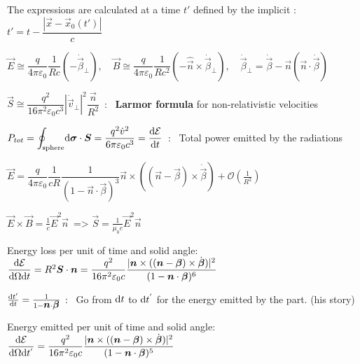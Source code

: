 \begin{squishlist}
The expressions are calculated at a time $t'$ defined by the implicit : $t' = t - \dfrac{|\vec{x} - \vec{x}_0(t')|}{c}$%

\end{squishlist}


\begin{squishlist}
\item $\vec{E} \cong \dfrac{q}{4\pi\varepsilon_0} \dfrac{1}{Rc} (-\dot{\vec{\beta}}_\perp), \quad \vec{B} \cong \dfrac{q}{4\pi\varepsilon_0} \dfrac{1}{Rc^2} (-\hat{\vec{n}}\times \dot{\vec{\beta}}_\perp) , \quad \dot{\vec{\beta}}_{\perp} = \dot{\vec{\beta}} - \vec{n}(\vec{n}\cdot\dot{\vec{\beta}}) $\\

\item $\vec{S} \cong \dfrac{q^2}{16 \pi^2 \varepsilon_0 c^3} |\dot{\vec{v}}_\perp|^2 \dfrac{\vec{n}}{R^2} \,$ : \, \textbf{Larmor formula} for non-relativistic velocities

\item $P_{tot} = \displaystyle{\oint_{\text{sphere}}} \mbox{\boldmath$\textrm{d} \sigma$}\cdot \mbox{\boldmath$S$} = \dfrac{q^2 \dot{v}^2}{6\pi\varepsilon_0 c^3}=\frac{\textrm{d} \mathcal{E}}{\textrm{d} t} \, $ : \, Total power emitted by the radiations
\end{squishlist}
\begin{squishlist}
\item $\vec{E} = \dfrac{q}{4\pi\varepsilon_0}\dfrac{1}{cR}\dfrac{1}{(1-\vec{n}\cdot\vec{\beta})^3} \vec{n} \times ((\vec{n} - \vec{\beta}) \times \dot{\vec{\beta}}) + \mathcal{O}\left(\frac{1}{R^2}\right)$

\item $\vec{E} \times \vec{B} = \frac{1}{c} \vec{E}^2 \vec{n} \, $ => $\vec{S} = \frac{1}{\mu_0 c} \vec{E}^2\vec{n}$

\item Energy loss per unit of time and solid angle: $\dfrac{\textrm{d} \mathcal{E}}{\textrm{d} \Omega \textrm{d} t} = R^2\mbox{\boldmath$S$}\cdot\mbox{\boldmath$n$} = \dfrac{q^2}{16\pi^2 \varepsilon_0 c} \dfrac{|\mbox{\boldmath$n$}\times ((\mbox{\boldmath$n$}-\mbox{\boldmath$\beta$}) \times \dot{\mbox{\boldmath$\beta$}})|^2}{(1-\mbox{\boldmath$n$}\cdot\mbox{\boldmath$\beta$})^6}$

\item $\frac{\textrm{d} t'}{\textrm{d} t} = \frac{1}{1-\mbox{\boldmath$n$}\cdot\mbox{\boldmath$\beta$}}$ : \  Go from $\textrm{d} t$ to $\textrm{d} t^{'}$ for the energy emitted by the part. (his story)  
\\
\item Energy emitted per unit of time and solid angle:
$\dfrac{\textrm{d} \mathcal{E}}{\textrm{d} \Omega \textrm{d} t^{'}} = \dfrac{q^2}{16\pi^2 \varepsilon_0 c} \dfrac{|\mbox{\boldmath$n$}\times ((\mbox{\boldmath$n$}-\mbox{\boldmath$\beta$}) \times \dot{\mbox{\boldmath$\beta$}})|^2}{(1-\mbox{\boldmath$n$}\cdot\mbox{\boldmath$\beta$})^5}$

\end{squishlist}

